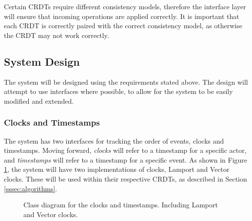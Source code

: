 \documentclass[12pt]{article}
\begin{document}
Certain CRDTs require different consistency models, therefore the interface layer will ensure that incoming operations are applied correctly. It is important that each CRDT is correctly paired with the correct consistency model, as otherwise the CRDT may not work correctly. \par

\subsection{System Design}
The system will be designed using the requirements stated above. The design will attempt to use interfaces where possible, to allow for the system to be easily modified and extended. 

\subsubsection{Clocks and Timestamps}


The system has two interfaces for tracking the order of events, clocks and timestamps. Moving forward, \textit{clocks} will refer to a timestamp for a specific actor, and \textit{timestamps} will refer to a timestamp for a specific event.  
As shown in Figure \ref{fig:ordered}, the system will have two implementations of clocks, Lamport and Vector clocks. These will be used within their respective CRDTs, as described in Section \ref{sssec:algorithms}. \par

\begin{figure}[H]
    \centering
    \caption{Class diagram for the clocks and timestamps. Including Lamport and Vector clocks.}
    \label{fig:ordered}
\end{figure} 
\end{document}
